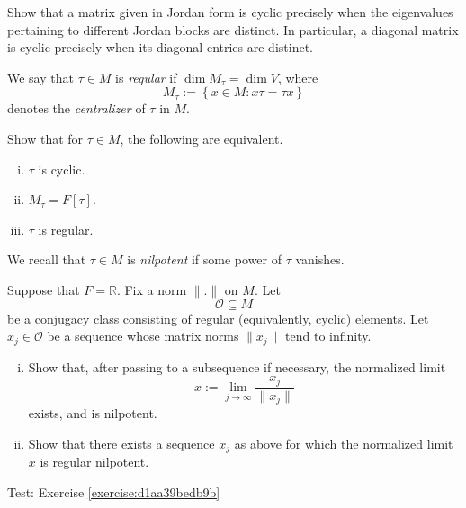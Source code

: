 \documentclass[reqno]{amsart} 
\begin{document}
\begin{exercise}\label{exercise:d1aa39bebb57}
  Show that a matrix given in Jordan form is cyclic precisely when the eigenvalues pertaining to different Jordan blocks are distinct.  In particular, a diagonal matrix is cyclic precisely when its diagonal entries are distinct.
\end{exercise}

\begin{definition}\label{definition:d1aa39bec426}
  We say that $\tau \in M$ is \emph{regular} if $\dim M_\tau = \dim V$, where
  \begin{equation*}
    M_\tau := \left\{ x \in M : x \tau = \tau x \right\}
  \end{equation*}
  denotes the \emph{centralizer} of $\tau$ in $M$.
\end{definition}

\begin{exercise}\label{exercise:d1aa39becb3a}
  Show that for $\tau \in M$, the following are equivalent.
  \begin{enumerate}[(i)]
\item $\tau$ is cyclic.
\item $M_\tau = F[\tau]$.
\item $\tau$ is regular.
\end{enumerate}
\end{exercise}

\begin{definition}\label{definition:d1aa39bed4ba}
We recall that $\tau \in M$ is \emph{nilpotent} if some power of $\tau$ vanishes.
\end{definition}


\begin{exercise}\label{exercise:d1aa39bedb9b}
  Suppose that $F = \mathbb{R}$.  Fix a norm $\lVert . \rVert$ on $M$.  Let
  \begin{equation*}
    \mathcal{O} \subseteq M
  \end{equation*}
  be a conjugacy class consisting of regular (equivalently, cyclic) elements.  Let $x_j \in \mathcal{O}$ be a sequence whose matrix norms $\lVert x_j \rVert$ tend to infinity.
\begin{enumerate}[(i)]
\item Show that, after passing to a subsequence if necessary, the normalized limit
  \begin{equation*}
x := \lim_{j \rightarrow \infty } \frac{x_j}{ \lVert x_j \rVert}
\end{equation*}
exists, and is nilpotent.
\item Show that there exists a sequence $x_j$ as above for which the normalized limit $x$ is regular nilpotent.
\end{enumerate}  
\end{exercise}



Test: Exercise \ref{exercise:d1aa39bedb9b}


{} 
\end{document}
